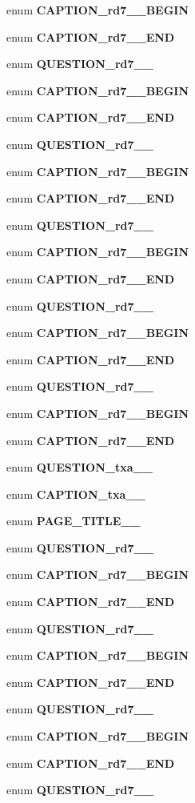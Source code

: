 \begin{CompactItemize}
\item 
enum {\bf CAPTION\_\-rd7\_\_\-BEGIN} 
\item 
enum {\bf CAPTION\_\-rd7\_\_\-END} 
\item 
enum {\bf QUESTION\_\-rd7\_\_\-} 
\item 
enum {\bf CAPTION\_\-rd7\_\_\-BEGIN} 
\item 
enum {\bf CAPTION\_\-rd7\_\_\-END} 
\item 
enum {\bf QUESTION\_\-rd7\_\_\-} 
\item 
enum {\bf CAPTION\_\-rd7\_\_\-BEGIN} 
\item 
enum {\bf CAPTION\_\-rd7\_\_\-END} 
\item 
enum {\bf QUESTION\_\-rd7\_\_\-} 
\item 
enum {\bf CAPTION\_\-rd7\_\_\-BEGIN} 
\item 
enum {\bf CAPTION\_\-rd7\_\_\-END} 
\item 
enum {\bf QUESTION\_\-rd7\_\_\-} 
\item 
enum {\bf CAPTION\_\-rd7\_\_\-BEGIN} 
\item 
enum {\bf CAPTION\_\-rd7\_\_\-END} 
\item 
enum {\bf QUESTION\_\-rd7\_\_\-} 
\item 
enum {\bf CAPTION\_\-rd7\_\_\-BEGIN} 
\item 
enum {\bf CAPTION\_\-rd7\_\_\-END} 
\item 
enum {\bf QUESTION\_\-txa\_\_\-} 
\item 
enum {\bf CAPTION\_\-txa\_\_\-} 
\item 
enum {\bf PAGE\_\-TITLE\_\_\-} 
\item 
enum {\bf QUESTION\_\-rd7\_\_\-} 
\item 
enum {\bf CAPTION\_\-rd7\_\_\-BEGIN} 
\item 
enum {\bf CAPTION\_\-rd7\_\_\-END} 
\item 
enum {\bf QUESTION\_\-rd7\_\_\-} 
\item 
enum {\bf CAPTION\_\-rd7\_\_\-BEGIN} 
\item 
enum {\bf CAPTION\_\-rd7\_\_\-END} 
\item 
enum {\bf QUESTION\_\-rd7\_\_\-} 
\item 
enum {\bf CAPTION\_\-rd7\_\_\-BEGIN} 
\item 
enum {\bf CAPTION\_\-rd7\_\_\-END} 
\item 
enum {\bf QUESTION\_\-rd7\_\_\-} 

\end{CompactItemize}
